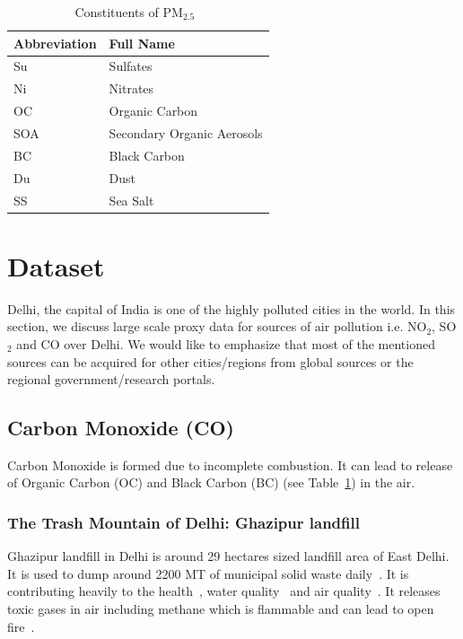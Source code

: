 \documentclass{article}
\begin{document}
\begin{table}[h]
    \centering
    \begin{tabular}{ll}
    \toprule
      Abbreviation   & Full Name \\
      \midrule
      Su & Sulfates \\
      Ni & Nitrates \\
      OC   & Organic Carbon \\
      SOA & Secondary Organic Aerosols\\
      BC & Black Carbon \\
      Du & Dust \\
      SS & Sea Salt \\
    \bottomrule
     \end{tabular}
    \caption{Constituents of PM$_{2.5}$~\cite{agarwal2024pollutionmapper}}
    \label{tab:sources}
\end{table}

\section{Dataset}
Delhi, the capital of India is one of the highly polluted cities in the world. In this section, we discuss large scale proxy data for sources of air pollution i.e. NO$_2$, SO$_2$ and CO over Delhi. We would like to emphasize that most of the mentioned sources can be acquired for other cities/regions from global sources or the regional government/research portals.

\subsection{Carbon Monoxide (CO)}
Carbon Monoxide is formed due to incomplete combustion. It can lead to release of Organic Carbon (OC) and Black Carbon (BC) (see Table~\ref{tab:sources}) in the air. 

\subsubsection{The Trash Mountain of Delhi: Ghazipur landfill}
Ghazipur landfill in Delhi is around 29 hectares sized landfill area of East Delhi. It is used to dump around 2200 MT of municipal solid waste daily~\cite{babbar2017groundwater}. It is contributing heavily to the health~\cite{yadav2023impacts}, water quality~\cite{babbar2017groundwater} and air quality~\cite{guttikunda2013gis}. It releases toxic gases in air including methane which is flammable and can lead to open fire~\cite{ranjan2014landfill}.
\end{document}
